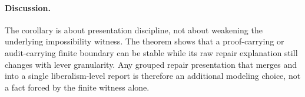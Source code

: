 \paragraph{Discussion.}
The corollary is about presentation discipline, not about weakening the underlying impossibility witness.
The theorem shows that a proof-carrying or audit-carrying finite boundary can be stable while its raw repair explanation still changes with lever granularity.
Any grouped repair presentation that merges  and  into a single liberalism-level report is therefore an additional modeling choice, not a fact forced by the finite witness alone.
